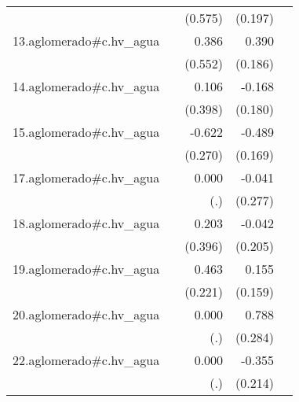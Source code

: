 {\begin{longtable}{l*{4}{D{.}{.}{-1}}}
            &                     &     (0.575)         &     (0.197)         &                     \\
\addlinespace
13.aglomerado#c.hv\_agua&                     &       0.386         &       0.390\sym{*}  &                     \\
            &                     &     (0.552)         &     (0.186)         &                     \\
\addlinespace
14.aglomerado#c.hv\_agua&                     &       0.106         &      -0.168         &                     \\
            &                     &     (0.398)         &     (0.180)         &                     \\
\addlinespace
15.aglomerado#c.hv\_agua&                     &      -0.622\sym{*}  &      -0.489\sym{**} &                     \\
            &                     &     (0.270)         &     (0.169)         &                     \\
\addlinespace
17.aglomerado#c.hv\_agua&                     &       0.000         &      -0.041         &                     \\
            &                     &         (.)         &     (0.277)         &                     \\
\addlinespace
18.aglomerado#c.hv\_agua&                     &       0.203         &      -0.042         &                     \\
            &                     &     (0.396)         &     (0.205)         &                     \\
\addlinespace
19.aglomerado#c.hv\_agua&                     &       0.463\sym{*}  &       0.155         &                     \\
            &                     &     (0.221)         &     (0.159)         &                     \\
\addlinespace
20.aglomerado#c.hv\_agua&                     &       0.000         &       0.788\sym{**} &                     \\
            &                     &         (.)         &     (0.284)         &                     \\
\addlinespace
22.aglomerado#c.hv\_agua&                     &       0.000         &      -0.355         &                     \\
            &                     &         (.)         &     (0.214)         &                     \\

\end{longtable}}
